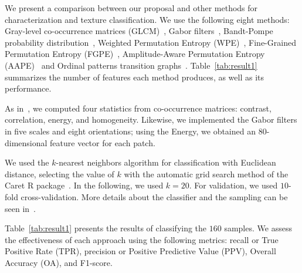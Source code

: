 \documentclass[journal]{IEEEtran}
\begin{document}
We present a comparison between our proposal and other methods for characterization and texture classification.
We use the following eight methods: 
Gray-level co-occurrence matrices (GLCM)~\cite{kourgli2012texture}, 
Gabor filters~\cite{weldon1996efficient},  
Bandt-Pompe probability distribution~\cite{Bandt2002Permutation}, 
Weighted Permutation Entropy (WPE)~\cite{Fadlallah2013Weightedpermutation},
Fine-Grained Permutation Entropy (FGPE)~\cite{xiao2009fine}, 
Amplitude-Aware Permutation Entropy (AAPE)~\cite{azami2016amplitude} and 
Ordinal patterns transition graphs~\cite{Borges2019Transition}.
Table~\ref{tab:result1} summarizes the number of features each method produces, as well as its performance.

As in~\cite{guan2019covariance}, 
we computed four statistics from co-occurrence matrices: contrast, correlation, energy, and homogeneity.
Likewise, we implemented the Gabor filters in five scales and eight orientations; using the Energy, we obtained an $80$-dimensional feature vector for each patch.


We used the $k$-nearest neighbors algorithm for classification with Euclidean distance, selecting the value of $k$ with the automatic grid search method of the Caret R package~\cite{kuhn2008building}.
In the following, we used $k = 20$.
For validation, we used $10$-fold cross-validation.
More details about the classifier and the sampling can be seen in~\cite{mitchell1997machine}.

Table~\ref{tab:result1} presents the results of classifying the $160$ samples.
We assess the effectiveness of each approach using the following metrics: recall or True Positive Rate (TPR), precision or Positive Predictive Value (PPV), Overall Accuracy (OA), and F1-score.
\end{document}
